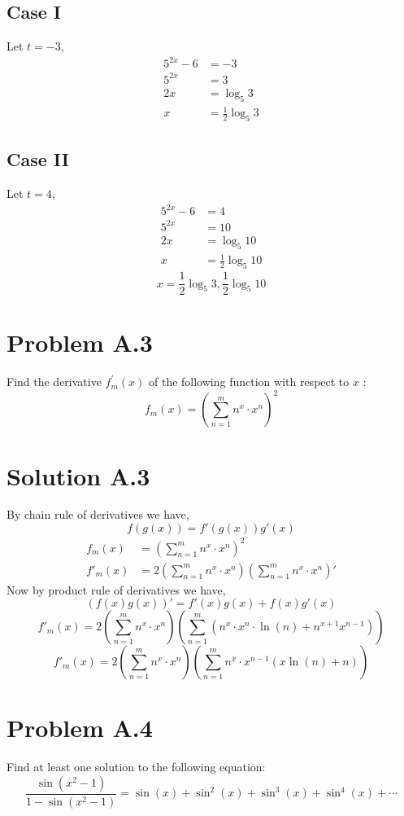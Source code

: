 \documentclass{article}
\begin{document}
\subsection*{Case I}
Let $t=-3$,
\begin{align*}
    5^{2x}-6&=-3 \\
    5^{2x}&=3 \\
    2x &= \log_5{3} \\
    x &= \frac{1}{2}\log_5{3}
\end{align*}
\subsection*{Case II}
Let $t=4$,
\begin{align*}
    5^{2x}-6&=4 \\
    5^{2x}&=10 \\
    2x&=\log_5{10} \\
    x&=\frac{1}{2}\log_5{10}
\end{align*}
$$\boxed{x=\frac{1}{2}\log_5{3}, \frac{1}{2}\log_5{10}}$$

\newpage
\section*{Problem A.3}
Find the derivative $f_{m}^{\prime}(x)$ of the following function with respect to $x$ :
$$
f_{m}(x)=\left(\sum_{n=1}^{m} n^{x} \cdot x^{n}\right)^{2}
$$
\section*{Solution A.3}
By chain rule of derivatives we have,
$$f(g(x))=f'(g(x))g'(x)$$
\begin{align*}
    f_m(x)&=\left(\sum\limits_{n=1}^{m}n^x\cdot x^n\right)^2 \\
    f'_m(x)&=2\left(\sum\limits_{n=1}^{m}n^x\cdot x^n\right)\left(\sum\limits_{n=1}^{m}n^x\cdot x^n\right)'
\end{align*}
Now by product rule of derivatives we have,
\[\left(f(x)g(x)\right)'=f'(x)g(x)+f(x)g'(x)\]
\[f'_m(x)=2\left(\sum_{n=1}^{m}n^x\cdot x^n\right)\left(\sum_{n=1}^{m} \left(n^x \cdot x^n \cdot \ln(n) + n^{x+1}x^{n-1}\right)\right)\]
\[\boxed{f'_m(x)=2\left(\sum_{n=1}^{m}n^x\cdot x^n\right)\left(\sum_{n=1}^{m}n^x \cdot x^{n-1} (x \ln(n)+n)\right)}\]

\newpage
\section*{Problem A.4}
Find at least one solution to the following equation:
$$
\frac{\sin \left(x^{2}-1\right)}{1-\sin \left(x^{2}-1\right)}=\sin (x)+\sin ^{2}(x)+\sin ^{3}(x)+\sin ^{4}(x)+\cdots
$$
\end{document}
